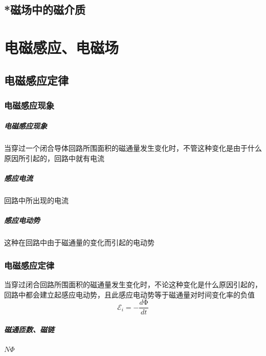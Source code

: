 \documentclass[UTF8,a4paper,12pt,scheme=chinese]{ctexbook}
\begin{document}
	\section{*磁场中的磁介质}
	\chapter{电磁感应、电磁场}
	\section{电磁感应定律}
	\subsection{电磁感应现象}
	\paragraph{电磁感应现象}当穿过一个闭合导体回路所围面积的磁通量发生变化时，不管这种变化是由于什么原因所引起的，回路中就有电流
	\paragraph{感应电流}回路中所出现的电流
	\paragraph{感应电动势}这种在回路中由于磁通量的变化而引起的电动势
	\subsection{电磁感应定律}
	当穿过闭合回路所围面积的磁通量发生变化时，不论这种变化是什么原因引起的，回路中都会建立起感应电动势，且此感应电动势等于磁通量对时间变化率的负值
	$$ \mathscr{E}_i=-\frac{d\mathrm{\Phi}}{dt} $$
	\paragraph{磁通匝数、磁链}$ N\Phi $
\end{document}
